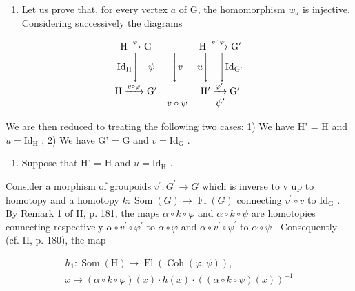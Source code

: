 \begin{enumerate}
\def\labelenumi{\alph{enumi})}
\setcounter{enumi}{2}
\tightlist
\item
  Let us prove that, for every vertex \(a\) of G, the homomorphism \(w_{a}\) is injective. Considering successively the diagrams
\end{enumerate}

\[
\begin{array}{c c c} \mathrm{H} \xrightarrow {\varphi} \mathrm{G} & & \mathrm{H} \xrightarrow {v \circ \varphi} \mathrm{G} ^ {\prime} \\ \mathrm{Id} _ {\mathrm{H}} \Biggl \downarrow \quad \psi & \Biggl \downarrow v & u \Biggl \downarrow \quad \Biggl \downarrow \mathrm{Id} _ {\mathrm{G} ^ {\prime}} \\ \mathrm{H} \xrightarrow {v \circ \varphi} \mathrm{G} ^ {\prime} & & \mathrm{H} ^ {\prime} \xrightarrow {\varphi^ {\prime}} \mathrm{G} ^ {\prime} \\ & v \circ \psi & \psi^ {\prime} \end{array}
\]

We are then reduced to treating the following two cases: 1) We have H' = H and \(u = \mathrm{Id}_{\mathrm{H}}\) ; 2) We have G' = G and \(v = \mathrm{Id}_{\mathrm{G}}\) .

\begin{enumerate}
\def\labelenumi{\arabic{enumi})}
\tightlist
\item
  Suppose that H' = H and \(u = \mathrm{Id}_{\mathrm{H}}\) .
\end{enumerate}

Consider a morphism of groupoids \(v^{\prime}: G^{\prime} \to G\) which is inverse to v up to homotopy and a homotopy \(k: \operatorname{Som}(G) \to \operatorname{Fl}(G)\) connecting \(v^{\prime} \circ v\) to \(\mathrm{Id}_{\mathrm{G}}\) . By Remark 1 of II, p. 181, the maps \(\alpha \circ k \circ \varphi\) and \(\alpha \circ k \circ \psi\) are homotopies connecting respectively \(\alpha \circ v^{\prime} \circ \varphi^{\prime}\) to \(\alpha \circ \varphi\) and \(\alpha\circ v^{\prime}\circ\psi^{\prime}\) to \(\alpha\circ\psi\) . Consequently (cf. II, p. 180), the map

\[
\begin{array}{c} h _ {1} \colon \operatorname{Som} (\mathrm{H}) \to \operatorname{Fl} (\operatorname{Coh} (\varphi , \psi)), \\ x \mapsto (\alpha \circ k \circ \varphi) (x) \cdot h (x) \cdot ((\alpha \circ k \circ \psi) (x)) ^ {- 1} \end{array}
\]

